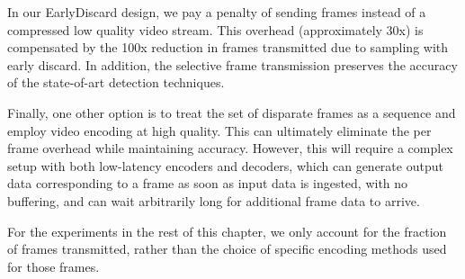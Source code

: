 In our EarlyDiscard design, we pay a penalty of sending frames instead of a
compressed low quality video stream. This overhead (approximately 30x) is
compensated by the 100x reduction in frames transmitted due to sampling with
early discard. In addition, the selective frame transmission preserves the
accuracy of the state-of-art detection techniques.

Finally, one other option is to treat the set of disparate frames as a sequence
and employ video encoding at high quality. This can ultimately eliminate the per
frame overhead while maintaining accuracy. However, this will require a complex setup with
both low-latency encoders and decoders, which can generate output data
corresponding to a frame as soon as input data is ingested, with no buffering,
and can wait arbitrarily long for additional frame data to arrive.

For the experiments in the rest of this chapter, we only account for the
fraction of frames transmitted, rather than the choice of specific encoding
methods used for those frames.